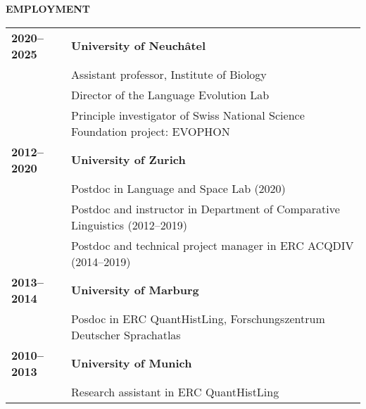 \documentclass[11pt]{article}
\begin{document}
\vskip 12pt
\begin{flushleft}
{\bf EMPLOYMENT}
\end{flushleft}
\begin{tabular}{lp{5.5in}}

\bf 2020--2025 & {\bf University of Neuchâtel} \\
& Assistant professor, Institute of Biology \\
& Director of the Language Evolution Lab \\
& Principle investigator of Swiss National Science Foundation project: EVOPHON \\

\bf 2012--2020 & {\bf University of Zurich} \\

& Postdoc in Language and Space Lab (2020) \\
& Postdoc and instructor in Department of Comparative Linguistics (2012--2019) \\
& Postdoc and technical project manager in ERC ACQDIV (2014--2019) \\


\bf 2013--2014 & {\bf University of Marburg} \\
& Posdoc in ERC QuantHistLing, Forschungszentrum Deutscher Sprachatlas \\

\bf 2010--2013 & {\bf University of Munich} \\
& Research assistant in ERC QuantHistLing \\


\end{tabular}
\end{document}
